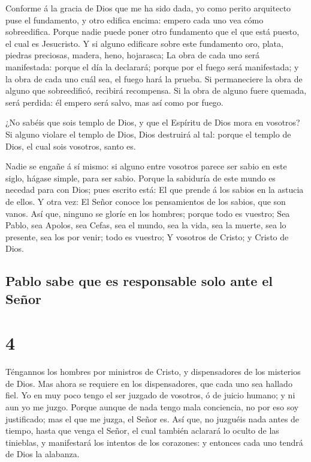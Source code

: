  Conforme á la gracia de Dios que me ha sido dada, yo
como perito arquitecto puse el fundamento, y otro edifica encima: empero
cada uno vea cómo sobreedifica.  Porque nadie puede poner
otro fundamento que el que está puesto, el cual es Jesucristo.
 Y si alguno edificare sobre este fundamento oro, plata,
piedras preciosas, madera, heno, hojarasca;  La obra de
cada uno será manifestada: porque el día la declarará; porque por el
fuego será manifestada; y la obra de cada uno cuál sea, el fuego hará la
prueba.  Si permaneciere la obra de alguno que
sobreedificó, recibirá recompensa.  Si la obra de alguno
fuere quemada, será perdida: él empero será salvo, mas así como por
fuego.

 ¿No sabéis que sois templo de Dios, y que el Espíritu de
Dios mora en vosotros?  Si alguno violare el templo de
Dios, Dios destruirá al tal: porque el templo de Dios, el cual sois
vosotros, santo es.

 Nadie se engañe á sí mismo: si alguno entre vosotros
parece ser sabio en este siglo, hágase simple, para ser sabio.
 Porque la sabiduría de este mundo es necedad para con
Dios; pues escrito está: El que prende á los sabios en la astucia de
ellos.  Y otra vez: El Señor conoce los pensamientos de
los sabios, que son vanos.  Así que, ninguno se gloríe en
los hombres; porque todo es vuestro;  Sea Pablo, sea
Apolos, sea Cefas, sea el mundo, sea la vida, sea la muerte, sea lo
presente, sea los por venir; todo es vuestro;  Y vosotros
de Cristo; y Cristo de Dios.

\hypertarget{pablo-sabe-que-es-responsable-solo-ante-el-seuxf1or}{%
\subsection{Pablo sabe que es responsable solo ante el
Señor}\label{pablo-sabe-que-es-responsable-solo-ante-el-seuxf1or}}

\hypertarget{section-3}{%
\section{4}\label{section-3}}

 Téngannos los hombres por ministros de Cristo, y
dispensadores de los misterios de Dios.  Mas ahora se
requiere en los dispensadores, que cada uno sea hallado fiel.
 Yo en muy poco tengo el ser juzgado de vosotros, ó de
juicio humano; y ni aun yo me juzgo.  Porque aunque de
nada tengo mala conciencia, no por eso soy justificado; mas el que me
juzga, el Señor es.  Así que, no juzguéis nada antes de
tiempo, hasta que venga el Señor, el cual también aclarará lo oculto de
las tinieblas, y manifestará los intentos de los corazones: y entonces
cada uno tendrá de Dios la alabanza.

